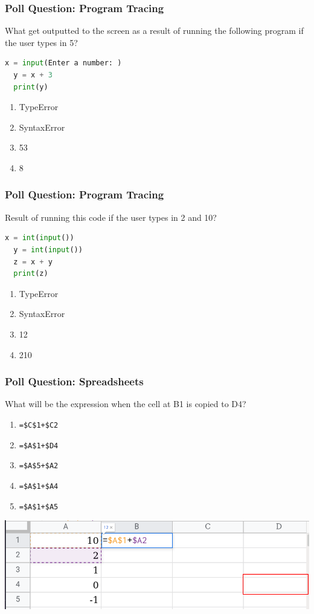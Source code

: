 \documentclass{beamer}
\begin{document}
%
%
%
\begin{frame}[fragile]
  \frametitle{Poll Question: Program Tracing}
  What get outputted to the screen as a result of running the following program if the user types in 5?
  \begin{lstlisting}[language=Python]
  x = input(Enter a number: )
  y = x + 3
  print(y)
  \end{lstlisting}
  \begin{enumerate}
    \item TypeError
    \item SyntaxError
    \item 53
    \item 8
  \end{enumerate}
\end{frame}

%
%
%
\begin{frame}[fragile]
  \frametitle{Poll Question: Program Tracing}
  Result of running this code if the user types in 2 and 10?
  \begin{lstlisting}[language=Python]
  x = int(input())
  y = int(input())
  z = x + y
  print(z)
  \end{lstlisting}
  \begin{enumerate}
    \item TypeError
    \item SyntaxError
    \item 12
    \item 210
  \end{enumerate}
\end{frame}

%
%
%
\begin{frame}[fragile]
  \frametitle{Poll Question: Spreadsheets}
  What will be the expression when the cell at B1 is copied to D4?
  \vfill
  \begin{minipage}{.29\textwidth}
    \begin{enumerate}
      \item \lstinline{=$C$1+$C2}
      \item \lstinline{=$A$1+$D4}
      \item \lstinline{=$A$5+$A2}
      \item \lstinline{=$A$1+$A4}
      \item \lstinline{=$A$1+$A5}
    \end{enumerate}
  \end{minipage}
  \begin{minipage}{.69\textwidth}
    \includegraphics[width=\textwidth]{./imgs/spreadsheet-slide-2.png}
  \end{minipage}
\end{frame}
\end{document}
